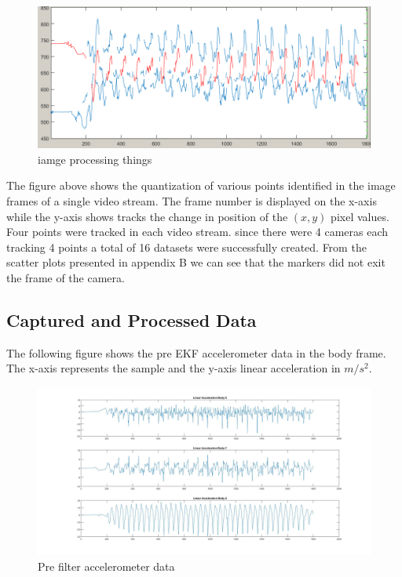 \begin{figure}[!ht] 
\captionsetup{width=0.8\linewidth, font=small}  
\includegraphics[width=\linewidth]{figures/ipdatapattern.png}
\caption{iamge processing things}
\label{fig:ipdatapattern}
\end{figure}

The figure above shows the quantization of various points identified in the image frames of a single video stream. The frame number is displayed on the x-axis while the y-axis shows tracks the change in position of the $ (x,y) $ pixel values. Four points were tracked in each video stream. since there were 4 cameras each tracking 4 points a total of 16 datasets were successfully created. From the scatter plots presented in appendix B we can see that the markers did not exit the frame of the camera. 

\newpage
\subsection{Captured and Processed Data}
The following figure shows the pre EKF accelerometer data in the body frame. The x-axis represents the sample and the y-axis linear acceleration in $ m/s^2 $.

\begin{figure}[!ht] 
\captionsetup{width=0.8\linewidth, font=small}  
\includegraphics[width=1\linewidth]{figures/accelerometer.jpg}
\caption{Pre filter accelerometer data}
\label{fig:accelerometer}
\end{figure}

